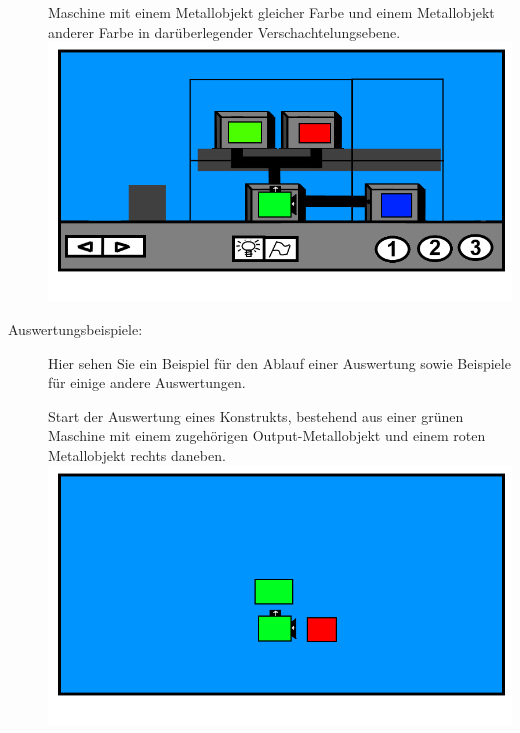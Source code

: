 \documentclass{scrartcl}
\begin{document}
\begin{description}
		\begin{minipage}{1\textwidth}
			Maschine mit einem Metallobjekt gleicher Farbe und einem Metallobjekt anderer Farbe in darüberlegender Verschachtelungsebene.\\
			\includegraphics[scale=0.5]{assets/LevelBsp2Out1OC}\\
		\end{minipage}

	\item[Auswertungsbeispiele:] \label{Levelaufbau:Asuwertungsbeispiele} Hier sehen Sie ein Beispiel für den Ablauf einer Auswertung sowie Beispiele für einige andere Auswertungen.\\
	
		\begin{minipage}{1\textwidth}
			Start der Auswertung eines Konstrukts, bestehend aus einer grünen Maschine mit einem zugehörigen Output-Metallobjekt und einem roten Metallobjekt rechts daneben.\\ 
			\includegraphics[scale=0.5]{assets/AuswertungAnimPic1}
		\end{minipage}
		

\end{description}
\end{document}
